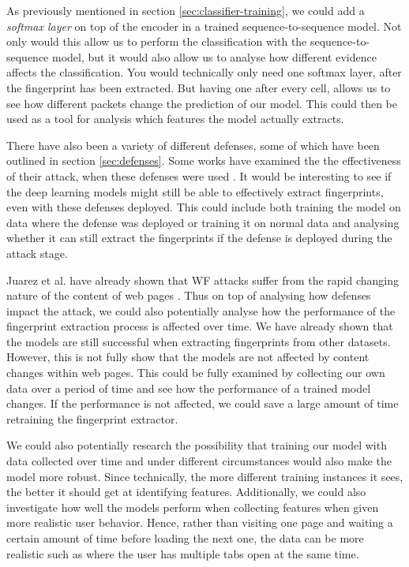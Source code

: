 As previously mentioned in section \ref{sec:classifier-training}, we could add a \textit{softmax layer} on top of the encoder in a trained sequence-to-sequence model.
Not only would this allow us to perform the classification with the sequence-to-sequence model, but it would also allow us to analyse how different evidence affects the classification.
You would technically only need one softmax layer, after the fingerprint has been extracted.
But having one after every cell, allows us to see how different packets change the prediction of our model.
This could then be used as a tool for analysis which features the model actually extracts.

There have also been a variety of different defenses, some of which have been outlined in section \ref{sec:defenses}.
Some works have examined the the effectiveness of their attack, when these defenses were used \cite{kfingerprinting,wang_cai_johnson_nithyanand_goldberg_2014}.
It would be interesting to see if the deep learning models might still be able to effectively extract fingerprints, even with these defenses deployed.
This could include both training the model on data where the defense was deployed or training it on normal data and analysing whether it can still extract the fingerprints if the defense is deployed during the attack stage.

Juarez et al. have already shown that WF attacks suffer from the rapid changing nature of the content of web pages \cite{wfpevaluation}.
Thus on top of analysing how defenses impact the attack, we could also potentially analyse how the performance of the fingerprint extraction process is affected over time.
We have already shown that the models are still successful when extracting fingerprints from other datasets.
However, this is not fully show that the models are not affected by content changes within web pages.
This could be fully examined by collecting our own data over a period of time and see how the performance of a trained model changes.
If the performance is not affected, we could save a large amount of time retraining the fingerprint extractor.

\newpage

We could also potentially research the possibility that training our model with data collected over time and under different circumstances would also make the model more robust.
Since technically, the more different training instances it sees, the better it should get at identifying features.
Additionally, we could also investigate how well the models perform when collecting features when given more realistic user behavior.
Hence, rather than visiting one page and waiting a certain amount of time before loading the next one, the data can be more realistic such as where the user has multiple tabs open at the same time.

